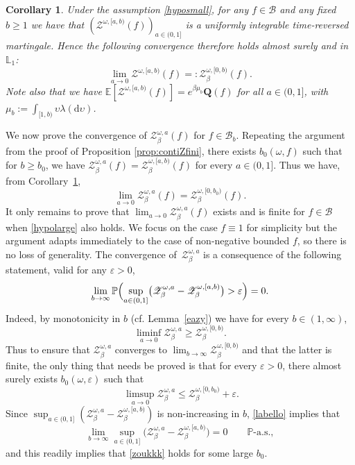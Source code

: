 \documentclass[11pt]{article}
\newcommand{\cf}{cf.\xspace}
\numberwithin{equation}{section}
\let\mathcal\mathscr
\newtheorem{cor}[theorem]{Corollary}
\theoremstyle{definition}
\newcommand{\dd}{\mathrm{d}}
\newcommand{\cB}{{\ensuremath{\mathcal B}} }
\newcommand{\cZ}{{\ensuremath{\mathcal Z}} }
\newcommand{\bQ}{{\ensuremath{\mathbf Q}} }
\newcommand{\bbE}{{\ensuremath{\mathbb E}} }
\newcommand{\bbL}{{\ensuremath{\mathbb L}} }
\newcommand{\bbP}{{\ensuremath{\mathbb P}} }
\let\gb\beta
\let\gep\varepsilon
\let\ups\upsilon
\let\go\omega
\begin{document}
\begin{cor}\label{lem:gene}
Under the assumption \eqref{hyposmall}, for any $f\in \cB$ and any fixed $b\geq 1$ we have that $(\cZ^{\go,[a,b)}(f))_{a\in(0,1]}$ is a uniformly integrable time-reversed martingale.
Hence the following convergence therefore holds almost surely and in $\bbL_1$:
\[
\lim_{a\to 0}\cZ^{\go,[a,b)}(f) =:\cZ^{\go,[0,b)}_\beta(f).
\]
Note also that we have $\bbE[ \cZ^{\go,[a,b)}(f) ] = e^{\gb \mu_b} \bQ(f)$ for all $a\in (0,1]$, with $\mu_b:= \int_{[1,b)} \ups \lambda(\dd \ups)$.
\end{cor}
We now prove the convergence of $\cZ^{\go,a}_\beta(f)$ for $f\in \cB_b$. Repeating the argument from the proof of Proposition \ref{prop:contiZfini}, there exists $b_0(\go,f)$ such that
for $b\ge b_0$, we have $\cZ^{\go,a}_\beta(f)=\cZ^{\go,[a,b)}_\beta(f)$ for every $a\in(0,1]$. Thus we have, from Corollary~\ref{lem:gene},
\begin{equation*}
\lim_{a\to 0}\cZ^{\go,a}_\beta(f)=\cZ^{\go,[0,b_0)}_\beta(f).
\end{equation*}
It only remains to prove that $\lim_{a\to 0}\cZ^{\go,a}_{\beta}(f)$ exists and is finite for $f\in \mathcal B$ when \eqref{hypolarge} also holds. We focus on the case $f\equiv 1$ for simplicity but the argument adapts immediately to the case of non-negative bounded $f$, so there is no loss of generality.
The convergence of~$\cZ^{\go,a}_\beta$ is a consequence of the following statement, valid
for any $\gep>0$,
\begin{equation}\label{labello}
\lim_{b\to \infty} \bbP\Bigl(\sup_{a\in(0,1]}\bigl(\cZ^{\go,a}_\beta - \cZ^{\go,[a,b)}_\beta\bigr) >\gep \Bigr) = 0.
\end{equation}
Indeed, by monotonicity in $b$ (\cf Lemma~\ref{eazy}) we have for every $b\in (1,\infty)$,
\[
\liminf_{a\to 0}\cZ^{\go,a}_\beta \ge
\cZ^{\go,[0,b)}_\beta.
\] Thus to ensure that $\cZ^{\go,a}_\beta$ converges to $\lim_{b\to \infty}\cZ^{\go,[0,b)}_\beta$ and that the latter is finite,
the only thing that needs be proved is that for every $\gep>0$, there almost surely exists $b_0(\go,\gep)$ such that
\begin{equation}\label{zoukkk}
\ \limsup_{a\to 0}\cZ^{\go,a}_\beta \le \cZ^{\go,[0,b_0)}_\beta+\gep.
\end{equation}
Since $\sup_{a\in(0,1]}(\cZ^{\go,a}_\beta - \cZ^{\go,[a,b)}_\beta)$ is non-increasing in $b$,
\eqref{labello} implies that
\begin{equation}
\label{labellobis}
\lim_{b\to\infty} \sup_{a\in(0,1]}\bigl(\cZ^{\go,a}_\beta - \cZ^{\go,[a,b)}_\beta \bigr) =0 \qquad \bbP\text{-a.s.},
\end{equation}
and this readily implies that \eqref{zoukkk} holds for some large $b_0$.
\end{document}
